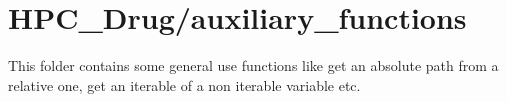 

\section{HPC\_Drug/auxiliary\_functions}
	
	This folder contains some general use functions like get an absolute path from a relative one, get an iterable of a non iterable variable etc.
	
	

	

	